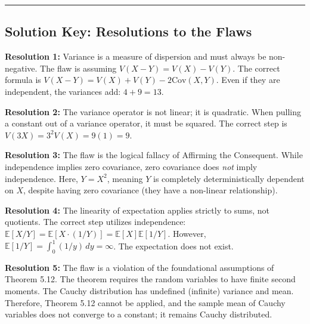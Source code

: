 \documentclass[11pt, a4paper]{article}
\theoremstyle{definition}
\theoremstyle{remark}
\newcommand{\E}{\mathbb{E}}
\begin{document}
\vspace{2em}
\hrule
\vspace{1em}
\subsection*{Solution Key: Resolutions to the Flaws}

\textbf{Resolution 1:} Variance is a measure of dispersion and must always be non-negative. The flaw is assuming $V(X-Y) = V(X) - V(Y)$. The correct formula is $V(X-Y) = V(X) + V(Y) - 2\text{Cov}(X,Y)$. Even if they are independent, the variances add: $4 + 9 = 13$.

\textbf{Resolution 2:} The variance operator is not linear; it is quadratic. When pulling a constant out of a variance operator, it must be squared. The correct step is $V(3X) = 3^2 V(X) = 9(1) = 9$.

\textbf{Resolution 3:} The flaw is the logical fallacy of Affirming the Consequent. While independence implies zero covariance, zero covariance does \textit{not} imply independence. Here, $Y = X^2$, meaning $Y$ is completely deterministically dependent on $X$, despite having zero covariance (they have a non-linear relationship).

\textbf{Resolution 4:} The linearity of expectation applies strictly to sums, not quotients. The correct step utilizes independence: $\E[X/Y] = \E[X \cdot (1/Y)] = \E[X]\E[1/Y]$. However, $\E[1/Y] = \int_0^1 (1/y) \, dy = \infty$. The expectation does not exist.

\textbf{Resolution 5:} The flaw is a violation of the foundational assumptions of Theorem 5.12. The theorem requires the random variables to have finite second moments. The Cauchy distribution has undefined (infinite) variance and mean. Therefore, Theorem 5.12 cannot be applied, and the sample mean of Cauchy variables does not converge to a constant; it remains Cauchy distributed.
\end{document}
